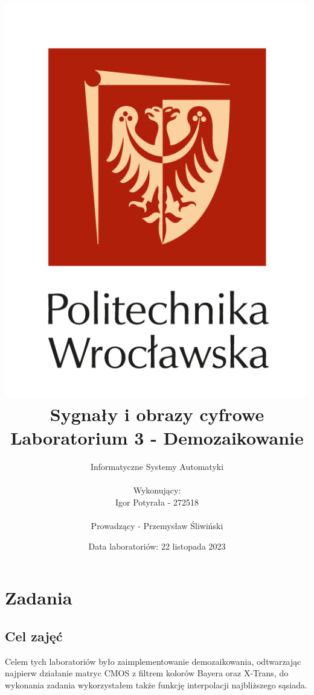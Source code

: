 \documentclass[14pt]{article}
\title{
    \includegraphics[scale=0.5]{images/logo-pwr-pion.png}
    \vspace{1cm}
    \\
    {\textbf{
    \titlefont Sygnały i obrazy cyfrowe
    \\ Laboratorium 3 - Demozaikowanie
    }}
}
\author{
    Informatyczne Systemy Automatyki
    \\
    \\ Wykonujący:
    \\ Igor Potyrała - 272518
    \\
    \\ Prowadzący - Przemysław Śliwiński
}
\date{Data laboratoriów: 22 listopada 2023}
\begin{document}
\maketitle
\newpage

\section{Zadania}
\subsection{Cel zajęć}
Celem tych laboratoriów było zaimplementowanie demozaikowania, 
odtwarzając najpierw działanie matryc CMOS z filtrem kolorów 
Bayera oraz X-Trans, do wykonania zadania wykorzystałem także funkcję
interpolacji najbliższego sąsiada.
\end{document}
